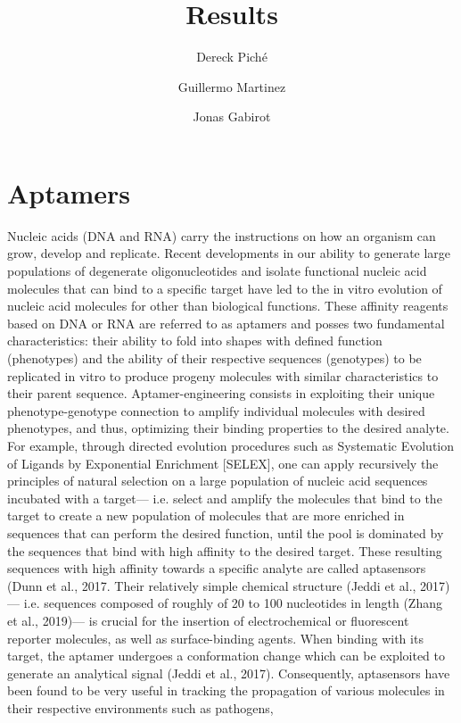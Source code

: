 \documentclass{article}
\title{Results}
\author
{
    Dereck Piché \and
    Guillermo Martinez \and
    Jonas Gabirot \and
}
\begin{document}
\maketitle

\section*{Aptamers}
Nucleic acids (DNA and RNA) carry the instructions on 
how an organism can grow, develop and replicate. Recent
 developments in our ability to generate large populations of 
 degenerate oligonucleotides and isolate functional nucleic acid 
 molecules that can bind to a specific target have led to the in 
 vitro evolution of nucleic acid molecules for other than biological functions. 
 These affinity reagents based on DNA or RNA are referred to as aptamers 
 and posses two fundamental characteristics: their ability to fold 
 into shapes with defined function (phenotypes) and the ability of 
 their respective sequences (genotypes) to be replicated in vitro to 
 produce progeny molecules with similar characteristics to their 
 parent sequence. Aptamer-engineering consists in exploiting their 
 unique phenotype-genotype connection to amplify individual molecules 
 with desired phenotypes, and thus, optimizing their binding properties 
 to the desired analyte.  For example, through directed evolution 
 procedures such as Systematic Evolution of Ligands by Exponential 
 Enrichment [SELEX], one can apply recursively the principles of 
 natural selection on a large population of nucleic acid sequences 
 incubated with a target— i.e. select and amplify the molecules 
 that bind to the target to create a new population of molecules 
 that are more enriched in sequences that can perform the desired 
 function, until the pool is dominated by the sequences that bind 
 with high affinity to the desired target. These resulting sequences 
 with high affinity towards a specific analyte are called aptasensors 
 (Dunn et al., 2017. Their relatively simple chemical structure 
 (Jeddi et al., 2017)— i.e. sequences composed of roughly of 20 to 
 100 nucleotides in length (Zhang et al., 2019)— is crucial for the 
 insertion of electrochemical or fluorescent reporter molecules, as 
 well as surface-binding agents. When binding with its target, the 
 aptamer undergoes a conformation change which can be exploited to 
 generate an analytical signal (Jeddi et al., 2017). Consequently, 
 aptasensors have been found to be very useful in tracking the propagation 
 of various molecules in their respective environments such as pathogens, 
\end{document}
